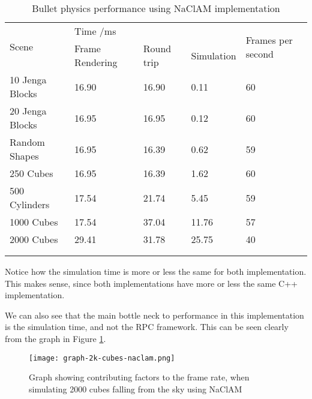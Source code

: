 \begin{table}[h]
\begin{tabular}{lllll}
\multirow{2}{*}{Scene}               & \multicolumn{3}{l}{Time /ms}              & \multirow{2}{*}{Frames per second} \\
                                     & Frame Rendering & Round trip & Simulation &                                    \\ \hline
\multicolumn{1}{l|}{10 Jenga Blocks} & 16.90           & 16.90      & 0.11       & 60                                 \\
\multicolumn{1}{l|}{20 Jenga Blocks} & 16.95           & 16.95      & 0.12       & 60                                 \\
\multicolumn{1}{l|}{Random Shapes}   & 16.95           & 16.39      & 0.62       & 59                                 \\
\multicolumn{1}{l|}{250 Cubes}       & 16.95           & 16.39      & 1.62       & 60                                 \\
\multicolumn{1}{l|}{500 Cylinders}   & 17.54           & 21.74      & 5.45       & 59                                 \\
\multicolumn{1}{l|}{1000 Cubes}      & 17.54           & 37.04      & 11.76      & 57                                 \\
\multicolumn{1}{l|}{2000 Cubes}      & 29.41           & 31.78      & 25.75      & 40                                 \\
                                     &                 &            &            &                                    \\
                                     &                 &            &            &                                   
\end{tabular}
\caption{Bullet physics performance using NaClAM implementation}
\end{table}

Notice how the simulation time is more or less the same for both implementation. This makes sense, since both implementations have more or less the same C++ implementation.

We can also see that the main bottle neck to performance in this implementation is the simulation time, and not the RPC framework. This can be seen clearly from the graph in Figure \ref{fig:graph-2k-cubes-naclam}.

\begin{figure}
    \centering
    \texttt{[image: graph-2k-cubes-naclam.png]} 
    \caption{Graph showing contributing factors to the frame rate, when simulating 2000 cubes falling from the sky using NaClAM}
    \label{fig:graph-2k-cubes-naclam}
\end{figure}

